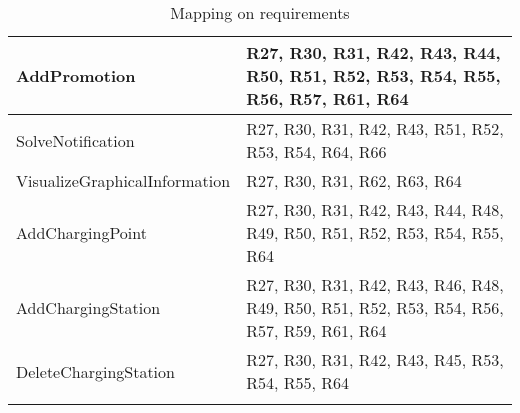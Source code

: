 \begin{center}
\begin{longtable}[H]{|p{0.4\linewidth}|p{0.6\linewidth}|}
     \hline
     AddPromotion & R27, R30, R31, R42, R43, R44, R50, R51, R52, R53, R54, R55, R56, R57, R61, R64 \\
     \hline
     SolveNotification & R27, R30, R31, R42, R43, R51, R52, R53, R54, R64, R66\\
     \hline
     VisualizeGraphicalInformation & R27, R30, R31, R62, R63, R64 \\
     \hline
     AddChargingPoint & R27, R30, R31, R42, R43, R44, R48, R49, R50, R51, R52, R53, R54, R55, R64 \\
     \hline
     AddChargingStation & R27, R30, R31, R42, R43, R46, R48, R49, R50, R51, R52, R53, R54, R56, R57, R59, R61, R64\\
     \hline
     DeleteChargingStation & R27, R30, R31, R42, R43, R45, R53, R54, R55, R64\\
     \hline
    \caption{Mapping on requirements}
    \label{tab:Mapping on requirements}
    \end{longtable}
\end{center}